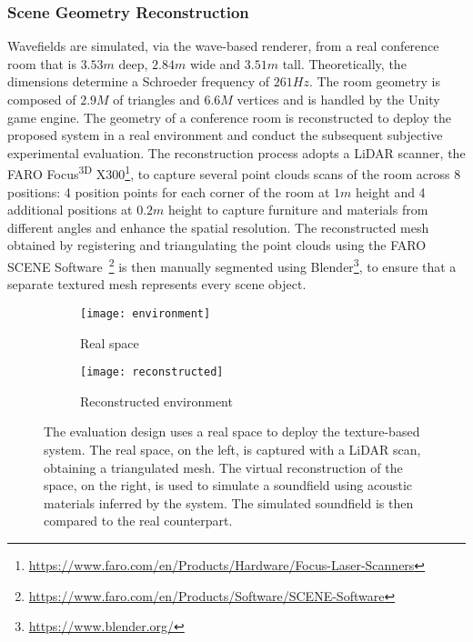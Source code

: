 \subsubsection{Scene Geometry Reconstruction}
Wavefields are simulated, via the wave-based renderer, from a real conference room that is $3.53m$ deep, $2.84m$ wide and $3.51m$ tall. Theoretically, the dimensions determine a Schroeder frequency of $261Hz$. The room geometry is composed of $2.9M$ of triangles and $6.6M$ vertices and is handled by the Unity game engine.
The geometry of a conference room is reconstructed to deploy the proposed system in a real environment and conduct the subsequent subjective experimental evaluation. The reconstruction process adopts a LiDAR scanner, the FARO Focus\textsuperscript{3D} X300\footnote{\url{https://www.faro.com/en/Products/Hardware/Focus-Laser-Scanners}}, to capture several point clouds scans of the room across 8 positions: 4 position points for each corner of the room at $1m$ height and 4 additional positions at $0.2m$ height to capture furniture and materials from different angles and enhance the spatial resolution. The reconstructed mesh obtained by registering and triangulating the point clouds using the FARO SCENE Software~\footnote{\url{https://www.faro.com/en/Products/Software/SCENE-Software}} is then manually segmented using Blender\footnote{\url{https://www.blender.org/}}, to ensure that a separate textured mesh represents every scene object.
\begin{figure}
    \centering
    \begin{subfigure}[t]{0.49\textwidth}
       \centering
       \texttt{[image: environment]}
       \caption{Real space}
       \label{fig:chi-input-env}
    \end{subfigure}
    \begin{subfigure}[t]{0.49\textwidth}
       \centering
       \texttt{[image: reconstructed]}
       \caption{Reconstructed environment}
       \label{fig:chi-reconstructed-env}
    \end{subfigure}
\caption[Texture-based system evaluation --- environment reconstruction process]{The evaluation design uses a real space to deploy the texture-based system. The real space, on the left, is captured with a LiDAR scan, obtaining a triangulated mesh. The virtual reconstruction of the space, on the right, is used to simulate a soundfield using acoustic materials inferred by the system. The simulated soundfield is then compared to the real counterpart.}
\label{fig:chi-scanning}
\end{figure}

